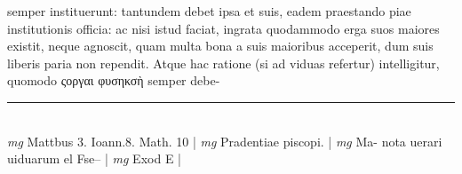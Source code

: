 \documentclass{article}
\begin{document}
\begin{pages}
semper instituerunt: tantundem debet ipsa et suis, eadem praestando piae institutionis officia: ac nisi istud faciat, ingrata quodammodo erga suos maiores existit, neque agnoscit, quam multa bona a suis maioribus acceperit, dum suis liberis paria non rependit. Atque hac ratione (si ad viduas refertur) intelligitur, quomodo ςοργαι φυσηκσὴ semper debe-  \pend
\vspace{0.5cm}\noindent
\vspace{0.2cm}\rule{1cm}{0.2pt}\\ 
\hspace{0.2cm}\textit{mg}
\footnotesize Mattbus 3. Ioann.8. Math. 10 
\normalsize| 
\hspace{0.2cm}\textit{mg}
\footnotesize Pradentiae piscopi. 
\normalsize| 
\hspace{0.2cm}\textit{mg}
\footnotesize Ma- nota uerari uiduarum el Fse-- 
\normalsize| 
\hspace{0.2cm}\textit{mg}
\footnotesize Exod E 
\normalsize| 

\end{pages}
\end{document}
